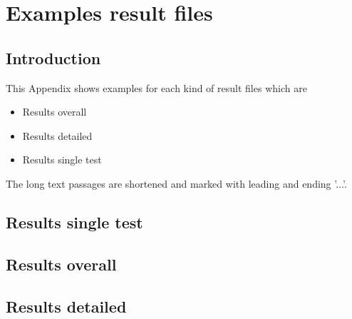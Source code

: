 
\chapter{Examples result files} %

\label{ResultFiles} %


\section{Introduction}

This Appendix shows examples for each kind of result files which are 

\begin{itemize}
\item Results overall
\item Results detailed
\item Results single test
\end{itemize}

The long text passages are shortened and marked with leading and ending '...'.

\section{Results single test}
\label{example:resultsSingleTest}




\pagebreak
\begin{landscape}
\section{Results overall}



\section{Results detailed}




\end{landscape}
